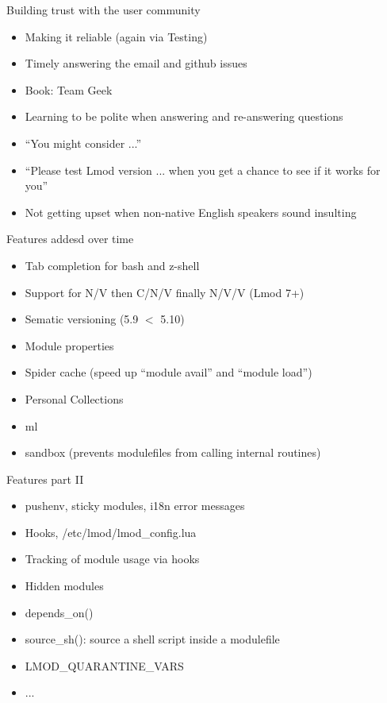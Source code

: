 \documentclass{beamer}
\begin{document}
\begin{frame}{Building trust with the user community}
  \begin{itemize}
    \item Making it reliable (again via Testing)
    \item Timely answering the email and github issues 
    \item Book: Team Geek
    \item Learning to be polite when answering and re-answering
      questions
    \item ``You might consider ...''
    \item ``Please test Lmod version ... when you get a chance to see
      if it works for you''
    \item Not getting upset when non-native English speakers sound
      insulting
  \end{itemize}
\end{frame}

\begin{frame}{Features addesd over time}
  \begin{itemize}
    \item Tab completion for bash and z-shell
    \item Support for N/V then C/N/V finally N/V/V (Lmod 7+)
    \item Sematic versioning (5.9 $<$ 5.10)
    \item Module properties
    \item Spider cache (speed up ``module avail'' and ``module load'')
    \item Personal Collections
    \item ml
    \item sandbox (prevents modulefiles from calling internal routines)
  \end{itemize}
\end{frame}

\begin{frame}{Features part II}
  \begin{itemize}
    \item pushenv, sticky modules, i18n error messages
    \item Hooks, /etc/lmod/lmod\_config.lua
    \item Tracking of module usage via hooks
    \item Hidden modules
    \item depends\_on()
    \item source\_sh(): source a shell script inside a modulefile
    \item LMOD\_QUARANTINE\_VARS
    \item ...
  \end{itemize}
\end{frame}
\end{document}
